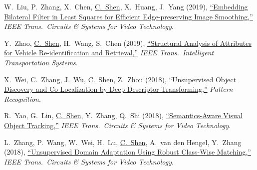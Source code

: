 \documentclass[9pt, a4paper]{article}
\newcommand{\years}[1]{\marginnote{\scriptsize #1}}
\def\highlight{\uline}
\begin{document}
\medskip

\years{2019} W.~Liu, P.~Zhang, X.~Chen, \highlight{C.~Shen}, X.~Huang, J.~Yang (2019),
\href{http://www.google.com/search?lr=&ie=UTF-8&oe=UTF-8&q=Embedding+Bilateral+Filter+in+Least+Squares+for+Efficient+Edge-preserving+Image+Smoothing+Wei+Liu%2C+Pingping+Zhang%2C+Xiaogang+Chen%2C+Chunhua+Shen%2C+Xiaolin+Huang%2C+Jie+Yang}{``Embedding Bilateral Filter in Least Squares for Efficient Edge-preserving Image Smoothing,{}''}
\emph{IEEE Trans.\  Circuits \& Systems for Video Technology}.

\medskip

\years{2019} Y.~Zhao, \highlight{C.~Shen}, H.~Wang, S.~Chen (2019),
\href{http://www.google.com/search?lr=&ie=UTF-8&oe=UTF-8&q=Structural+Analysis+of+Attributes+for+Vehicle+Re-identification+and+Retrieval+Yanzhu+Zhao%2C+Chunhua+Shen%2C+Huibing+Wang%2C+Shengyong+Chen}{``Structural Analysis of Attributes for Vehicle Re-identification and Retrieval,{}''}
\emph{IEEE Trans.\  Intelligent Transportation Systems}.

\medskip

\years{2018} X.~Wei, C.~Zhang, J.~Wu, \highlight{C.~Shen}, Z.~Zhou (2018),
\href{http://www.google.com/search?lr=&ie=UTF-8&oe=UTF-8&q=Unsupervised+Object+Discovery+and+Co-Localization+by+Deep+Descriptor+Transforming+Xiu-Shen+Wei%2C+Chen-Lin+Zhang%2C+Jianxin+Wu%2C+Chunhua+Shen%2C+Zhi-Hua+Zhou}{``Unsupervised Object Discovery and Co-Localization by Deep Descriptor Transforming,{}''}
\emph{Pattern Recognition}.

\medskip

\years{2018} R.~Yao, G.~Lin, \highlight{C.~Shen}, Y.~Zhang, Q.~Shi (2018),
\href{http://www.google.com/search?lr=&ie=UTF-8&oe=UTF-8&q=Semantics-Aware+Visual+Object+Tracking+Rui+Yao%2C+Guosheng+Lin%2C+Chunhua+Shen%2C+Yanning+Zhang%2C+Qinfeng+Shi}{``Semantics-Aware Visual Object Tracking,{}''}
\emph{IEEE Trans.\  Circuits \& Systems for Video Technology}.

\medskip

\years{2018} L.~Zhang, P.~Wang, W.~Wei, H.~Lu, \highlight{C.~Shen}, A.~van den Hengel, Y.~Zhang (2018),
\href{http://www.google.com/search?lr=&ie=UTF-8&oe=UTF-8&q=Unsupervised+Domain+Adaptation+Using+Robust+Class-Wise+Matching+Lei+Zhang%2C+Peng+Wang%2C+Wei+Wei%2C+Hao+Lu%2C+Chunhua+Shen%2C+Anton+van+den+Hengel%2C+Yanning+Zhang}{``Unsupervised Domain Adaptation Using Robust Class-Wise Matching,{}''}
\emph{IEEE Trans.\  Circuits \& Systems for Video Technology}.

\medskip
\end{document}
